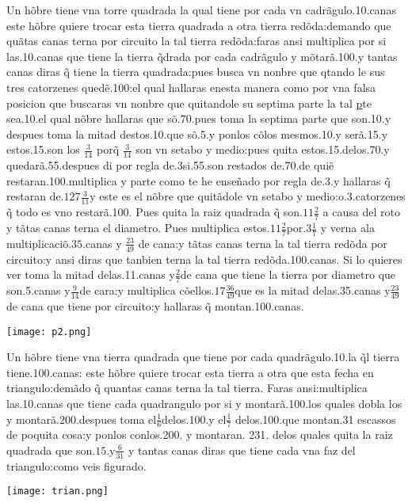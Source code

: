 \documentclass{amsart}
\begin{document}
Un h\~obre tiene vna torre quadrada la qual tiene por cada vn
cadr\~agulo.10.canas este h\~obre quiere trocar esta tierra quadrada a otra tierra red\~oda:demando que qu\~atas canas terna por circuito la tal tierra red\~oda:faras ansi multiplica por si las.10.canas que tiene la tierra \~qdrada por cada cadr\~agulo y m\~otar\~a.100.y tantas canas diras \~q tiene la tierra quadrada:pues busca vn nonbre que qtando le sus tres catorzenes qued\~e.100:el qual hallaras enesta manera como por vna falsa posicion que buscaras vn nonbre que quitandole su septima parte la tal \underline{p}te sea.10.el qual n\~obre hallaras que s\~o.70.pues toma la septima parte que son.10.y despues
toma la mitad destos.10.que s\~o.5.y ponlos c\~olos mesmos.10.y ser\~a.15.y estos.15.son los $\frac{3}{14}$ por\~q $\frac{3}{14}$ son vn setabo y medio:pues quita estos.15.delos.70.y quedar\~a.55.despues di por regla de.3si.55.son restados de.70.de qui\~e restaran.100.multiplica y parte como te he ense\~nado por regla de.3.y hallaras \~q restaran de.{\color{red}$127\frac{3}{11}$}y este es el n\~obre que quit\~adole vn setabo y medio:o.3.catorzenes \~q todo es vno restar\~a.100. Pues quita la raiz quadrada \~q son.{\color{red}$11\frac 27$} a causa del roto y t\~atas canas terna el diametro. Pues multiplica estos.$11\frac 27$por.$3\frac 17$ y verna ala multiplicaci\~o.$35$.canas y $\frac{23}{49}$ de cana:y t\~atas canas terna la tal tierra red\~oda por circuito:y ansi diras que tanbien terna la tal tierra red\~oda.100.canas. Si lo quieres ver toma la mitad delas.11.canas y$\frac 27$de cana que tiene la tierra por diametro que son.5.canas y$\frac {9}{14}$de cara:y multiplica c\~oellos.$17\frac{36}{49}$que es la mitad delas.35.canas y$\frac{23}{49}$de cana que tiene por circuito:y hallaras \~q montan.100.canas.

\vspace{1cm}
\begin{center}
\texttt{[image: p2.png]}
\end{center}

Un h\~obre tiene vna tierra quadrada que tiene por cada quadr\~agulo.10.la \~ql tierra tiene.100.canas: este h\~obre quiere trocar esta tierra a otra que esta fecha en triangulo:dem\~ado \~q quantas canas terna la tal tierra. Faras ansi:multiplica las.10.canas que tiene cada quadrangulo por si y montar\~a.100.los quales dobla los y montar\~a.{\color{red}$200$.despues toma el$\frac{1}{6}$delos.100.y el$\frac 17$ delos.100.}que montan.31 escassos de poquita cosa:y ponlos conlos.200. y montaran. 231. delos quales quita la raiz quadrada que son.$15$.y$\frac{6}{31}$ y tantas canas diras que tiene cada vna faz del triangulo:como veis figurado.
 \begin{center}
\texttt{[image: trian.png]}
\end{center}
\end{document}
